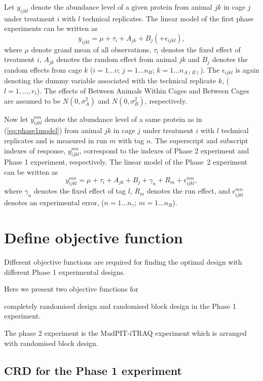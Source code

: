 \documentclass[article]{jss}
\begin{document}
Let $y_{ijkl}$ denote the abundance level of a given protein from animal $jk$ in cage $j$ under treatment $i$ with $l$ technical replicates. The linear model of the first phase experiments can be written as 
\begin{equation}\label{eq:phase1model}
y_{ijkl} = \mu + \tau_i + A_{jk} + B_{j}(+ \epsilon_{ijkl}),
\end{equation}
where $\mu$ denote grand mean of all observations, $\tau_i$ denotes the fixed effect of treatment $i$, $A_{jk}$ denotes the random effect from animal $jk$ and $B_{j}$ denotes the random effects from cage $k$ ($i = 1 \dots v$; $j = 1 \dots n_B$; $k = 1 \dots n_{A(B)}$). The $\epsilon_{ijkl}$ is again denoting the dummy variable associated with the technical replicate $k$, ($l = 1,\dots,r_t$). The effects of Between Animals Within Cages and Between Cages are assumed to be $N(0, \sigma_{A}^2)$ and $N(0, \sigma_{B}^2)$, respectively.

Now let $y_{ijkl}^{mn}$ denote the abundance level of a same protein as in (\ref{eq:phase1model}) from animal $jk$ in cage $j$ under treatment $i$ with $l$ technical replicates and is measured in run $m$ with tag $n$. The superscript and subscript indexes of response, $y_{ijkl}^{mn}$, correspond to the indexes of Phase 2 experiment and Phase 1 experiment, respectively. The linear model of the Phase~2 experiment can be written as
\begin{equation}\label{eq:model}
y_{ijkl}^{mn} = \mu+ \tau_i + A_{jk}+ B_{j} + \gamma_n + R_m + \epsilon_{ijkl}^{mn},
\end{equation}
where $\gamma_n$ denotes the fixed effect of tag $l$, $R_m$ denotes the run effect, and $ \epsilon_{ijkl}^{mn}$ denotes an experimental error, ($n = 1 \dots n_\gamma$; $m = 1 \dots n_R$). 

\section[Define objective function]{Define objective function}
Different objective functions are required for finding the optimal design with different Phase 1 experimental designs. 

Here we present two objective functions for 

completely randomised design and randomised block design in the Phase 1 experiment. 

The phase 2 experiment is the MudPIT-iTRAQ experiment which is arranged with randomised block design.


\subsection{CRD for the Phase 1 experiment}
\end{document}
